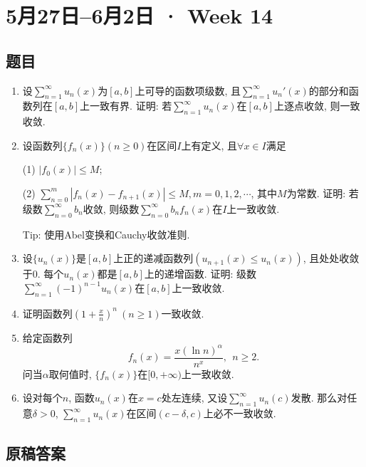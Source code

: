 \documentclass[UTF8,11pt, a4paper, oneside, fontset=none]{ctexbook}
\begin{document}
\clearpage

\section{5月27日--6月2日 · Week 14}

\subsection*{题目}

\begin{enumerate}

\item 设$\sum_{n=1}^{\infty} u_n(x)$为$[a, b]$上可导的函数项级数, 且$\sum_{n=1}^{\infty} u_n'(x)$的部分和函数列在$[a, b]$上一致有界. 证明: 若$\sum_{n=1}^{\infty} u_n(x)$在$[a, b]$上逐点收敛, 则一致收敛.

\item 设函数列$\{f_n(x) \} (n \geq 0)$在区间$I$上有定义, 且$\forall x \in I$满足

(1) $|f_0(x)| \leq M$;

(2) $\sum_{n=0}^m |f_n(x) - f_{n+1}(x)| \leq M, m = 0, 1, 2, \cdots$, 其中$M$为常数. 证明: 若级数$\sum_{n=0}^{\infty} b_n$收敛, 则级数$\sum_{n=0}^{\infty} b_n f_n(x)$在$I$上一致收敛.

Tip: 使用Abel变换和Cauchy收敛准则.

\item 设$\{ u_n(x) \}$是$[a, b]$上正的递减函数列$(u_{n+1}(x) \leq u_n(x))$, 且处处收敛于0. 每个$u_n(x)$都是$[a, b]$上的递增函数. 证明: 级数$\sum_{n=1}^{\infty} (-1)^{n-1} u_n(x)$在$[a, b]$上一致收敛.

\item 证明函数列$\left( 1 + \frac{x}{n} \right)^n \ (n \geq 1)$一致收敛.

\item 给定函数列
\[
f_n(x) = \frac{x (\ln n)^{\alpha}}{n^x}, \ \ n \geq 2.
\]
问当$\alpha$取何值时, $\{ f_n(x) \}$在$[0, +\infty)$上一致收敛.

\item 设对每个$n$, 函数$u_n(x)$在$x = c$处左连续, 又设$\sum_{n=1}^{\infty} u_n(c)$发散. 那么对任意$\delta >0$, $\sum_{n=1}^{\infty} u_n(x)$在区间$(c-\delta, c)$上必不一致收敛.

\end{enumerate}

\clearpage

\subsection*{原稿答案}
\end{document}

